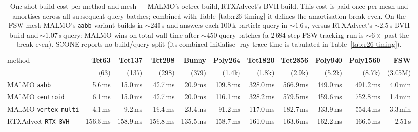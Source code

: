 \begin{table}[t]
\centering\small
\caption{One-shot build cost per method and mesh --- MALMO's octree build, RTXAdvect's BVH build.  This cost is paid once per mesh and amortises across all subsequent query batches; combined with Table~\ref{tab:r26-timing} it defines the amortisation break-even.  On the FSW mesh MALMO's \texttt{aabb} variant builds in $\sim 240$\,s and answers each 100\,k-particle query in $\sim 1.6$\,s, versus RTXAdvect's $\sim 2.5$\,s BVH build and $\sim 1.07$\,s query; MALMO wins on total wall-time after $\sim 450$ query batches (a 2\,684-step FSW tracking run is $\sim 6\times$ past the break-even).  SCONE reports no build/query split (its combined initialise+ray-trace time is tabulated in Table~\ref{tab:r26-timing}).}
\label{tab:r26-build}
\begin{tabular}{lrrrrrrrrrr}
\toprule
method & \textbf{Tet63} & \textbf{Tet137} & \textbf{Tet298} & \textbf{Bunny} & \textbf{Poly264} & \textbf{Tet1820} & \textbf{Tet2856} & \textbf{Poly940} & \textbf{Poly1560} & \textbf{FSW} \\
 & (63) & (137) & (298) & (379) & (1.4k) & (1.8k) & (2.9k) & (5.2k) & (8.7k) & (3.05M) \\
\midrule
MALMO \texttt{aabb} & 5.6\,ms & 15.0\,ms & 42.7\,ms & 20.9\,ms & 109.8\,ms & 328.0\,ms & 566.9\,ms & 449.0\,ms & 491.2\,ms & 4.0\,min \\
MALMO \texttt{centroid} & 6.1\,ms & 15.0\,ms & 42.7\,ms & 20.0\,ms & 116.1\,ms & 328.2\,ms & 579.5\,ms & 459.6\,ms & 752.8\,ms & 1.4\,min \\
MALMO \texttt{vertex\_multi} & 4.1\,ms & 9.2\,ms & 19.4\,ms & 23.4\,ms & 91.2\,ms & 117.0\,ms & 182.7\,ms & 333.9\,ms & 554.4\,ms & 3.3\,min \\
\midrule
RTXAdvect \texttt{RTX\_BVH} & 156.8\,ms & 158.9\,ms & 159.8\,ms & 135.5\,ms & 158.7\,ms & 161.0\,ms & 163.6\,ms & 162.2\,ms & 166.5\,ms & 2.51\,s \\
\bottomrule
\end{tabular}
\end{table}
